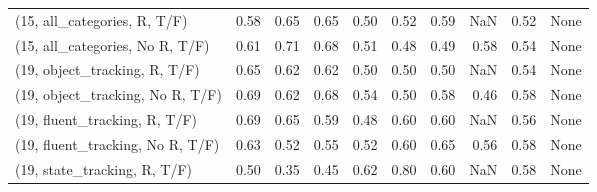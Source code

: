 \begin{table*}[h!]
\begin{adjustbox}{width=2\columnwidth,center}
\begin{tabular}{lrrr|rrr|rrr}
(15, all\_categories, R, T/F)          &                      0.58 &                  0.65 &                      0.65 &                          0.50 &                      0.52 &                          0.59 &                                    NaN &                               0.52 &                                  None \\
(15, all\_categories, No R, T/F)       &                      0.61 &                  0.71 &                      0.68 &                          0.51 &                      0.48 &                          0.49 &                                   0.58 &                               0.54 &                                  None \\



\midrule
(19, object\_tracking, R, T/F)         &                      0.65 &                  0.62 &                      0.62 &                          0.50 &                      0.50 &                          0.50 &                                    NaN &                               0.54 &                                  None \\
(19, object\_tracking, No R, T/F)      &                      0.69 &                  0.62 &                      0.68 &                          0.54 &                      0.50 &                          0.58 &                                   0.46 &                               0.58 &                                  None \\
(19, fluent\_tracking, R, T/F)         &                      0.69 &                  0.65 &                      0.59 &                          0.48 &                      0.60 &                          0.60 &                                    NaN &                               0.56 &                                  None \\
(19, fluent\_tracking, No R, T/F)      &                      0.63 &                  0.52 &                      0.55 &                          0.52 &                      0.60 &                          0.65 &                                   0.56 &                               0.58 &                                  None \\
(19, state\_tracking, R, T/F)          &                      0.50 &                  0.35 &                      0.45 &                          0.62 &                      0.80 &                          0.60 &                                    NaN &                               0.58 &                                  None \\

\end{tabular}
\end{adjustbox}
\end{table*}
